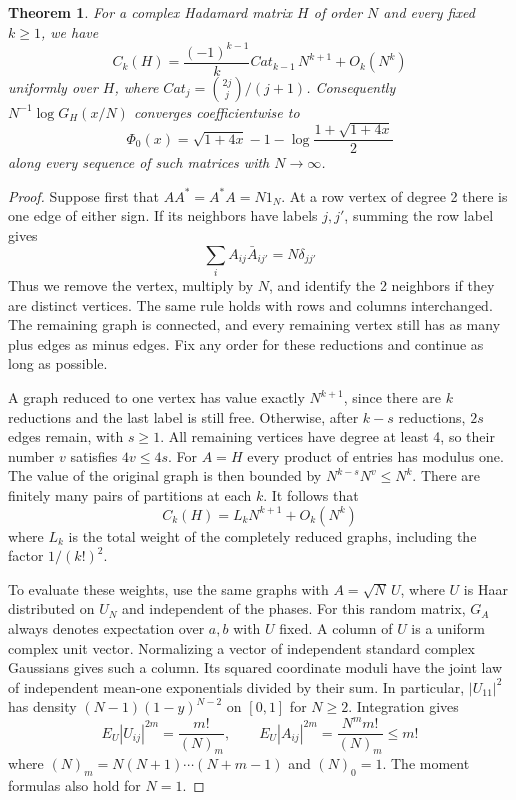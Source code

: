 \documentclass[11pt,a4paper]{article}
\newtheorem{thm}{Theorem}[section]
\theoremstyle{remark}
\begin{document}
\begin{samepage}
\begin{thm}\label{thm:free-leading}
For a complex Hadamard matrix $H$ of order $N$ and every fixed $k\geq1$,
we have
\[
 C_k(H)=\frac{(-1)^{k-1}}{k}Cat_{k-1}\,N^{k+1}+O_k(N^k)
\]
uniformly over $H$, where $Cat_j=\binom{2j}{j}/(j+1)$. Consequently
$N^{-1}\log G_H(x/N)$ converges coefficientwise to
\[
 \Phi_0(x)=\sqrt{1+4x}-1-\log\frac{1+\sqrt{1+4x}}2
\]
along every sequence of such matrices with $N\to\infty$.
\end{thm}
\end{samepage}
\begin{proof}
Suppose first that $AA^*=A^*A=N1_N$. At a row vertex of degree 2
there is one edge of either sign. If its neighbors have labels $j,j'$,
summing the row label gives
\[
 \sum_i A_{ij}\bar A_{ij'}=N\delta_{jj'}
\]
Thus we remove the vertex, multiply by $N$, and identify the 2 neighbors
if they are distinct vertices. The same rule holds with rows and columns
interchanged. The remaining graph is connected, and every remaining
vertex still has as many plus edges as minus edges. Fix any order for
these reductions and continue as long as possible.

A graph reduced to one vertex has value exactly $N^{k+1}$, since there are
$k$ reductions and the last label is still free. Otherwise, after $k-s$
reductions, $2s$ edges remain, with $s\geq1$. All remaining vertices have
degree at least 4, so their number $v$ satisfies $4v\leq4s$.
For $A=H$ every product of entries has modulus one. The value of the
original graph is then bounded by $N^{k-s}N^v\leq N^k$.
There are finitely many pairs of partitions at each $k$. It follows that
\[
 C_k(H)=L_kN^{k+1}+O_k(N^k)
\]
where $L_k$ is the total weight of the completely reduced graphs,
including the factor $1/(k!)^2$.

To evaluate these weights, use the same graphs with $A=\sqrt N\,U$,
where $U$ is Haar distributed on $U_N$ and independent of the phases.
For this random matrix, $G_A$ always denotes expectation over $a,b$ with
$U$ fixed. A column of $U$ is a uniform complex unit vector. Normalizing
a vector of independent standard complex Gaussians gives such a column.
Its squared coordinate moduli have the joint law of independent mean-one exponentials
divided by their sum. In particular, $|U_{11}|^2$ has density
$(N-1)(1-y)^{N-2}$ on $[0,1]$ for $N\geq2$. Integration gives
\[
 E_U|U_{ij}|^{2m}=\frac{m!}{(N)_m},\qquad
 E_U|A_{ij}|^{2m}=\frac{N^m m!}{(N)_m}\leq m!
\]
where $(N)_m=N(N+1)\cdots(N+m-1)$ and $(N)_0=1$. The moment formulas
also hold for $N=1$.


\end{proof}
\end{document}
